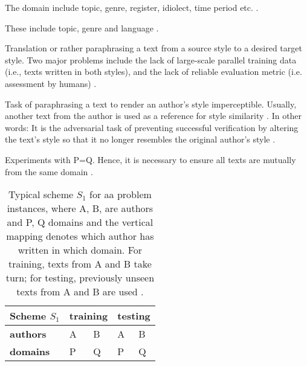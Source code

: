 \begin{definition}
    [Domain]
    The domain include topic, genre, register, idiolect, time period etc. \cite{bischoff_importance_2020}.
\end{definition}
  
\begin{definition}
    These include topic, genre and language \cite{bischoff_importance_2020}.
\end{definition}

\begin{definition}
    Translation or rather paraphrasing a text from a source style to a desired target style.
    Two major problems include the lack of large-scale parallel training data (i.e., texts written in both styles), 
    and the lack of reliable evaluation metric (i.e. assessment by humans) \cite{bischoff_importance_2020}.
\end{definition}

\begin{definition}
    Task of paraphrasing a text to render an author's style imperceptible.
    Usually, another text from the author is used as a reference for style similarity \cite{bischoff_importance_2020}.
    In other words: It is the adversarial task of preventing successful verification by altering the text's style so that 
    it no longer resembles the original author's style \cite{bevendorff_divergence_based_2020}.
\end{definition}

\begin{definition}
    Experiments with P=Q.
    Hence, it is necessary to ensure all texts are mutually from the same domain \cite{bischoff_importance_2020}.
    \begin{table}[]
        \centering
        \caption{Typical scheme $S_1$ for \ac{aa} problem instances, where A, B, are authors and P, Q domains and 
        the vertical mapping denotes which author has written in which domain. 
        For training, texts from A and B take turn; for testing, previously unseen texts from A and B are used \cite{bischoff_importance_2020}.}
        \label{tab:within_domain_aa}
        \begin{tabular}{|l|ll|ll|}
        \hline
        \textbf{Scheme $S_1$} & \multicolumn{2}{l|}{\textbf{training}} & \multicolumn{2}{l|}{\textbf{testing}} \\ \hline
        \textbf{authors} & \multicolumn{1}{l|}{A} & B & \multicolumn{1}{l|}{A} & B \\ \hline
        \textbf{domains} & \multicolumn{1}{l|}{P} & Q & \multicolumn{1}{l|}{P} & Q \\ \hline
        \end{tabular}%
    \end{table}
\end{definition}

